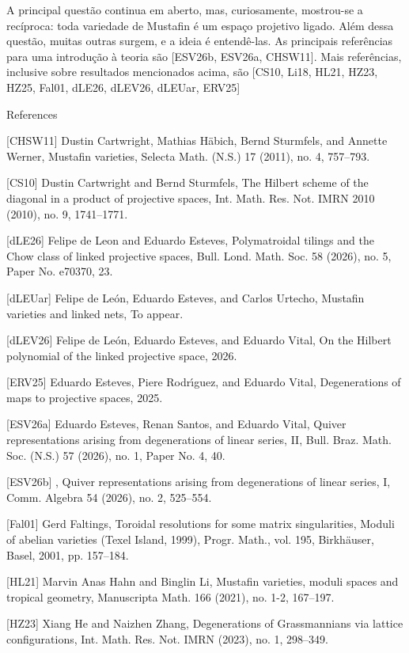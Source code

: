 A principal questão continua em aberto, mas,
curiosamente, mostrou-se a recíproca: toda
variedade de Mustafin é um espaço projetivo
ligado. Além dessa questão, muitas outras
surgem, e a ideia é entendê-las. As
principais referências para uma introdução à
teoria são [ESV26b, ESV26a, CHSW11]. Mais
referências, inclusive sobre resultados
mencionados acima, são [CS10, Li18, HL21,
HZ23, HZ25, Fal01, dLE26, dLEV26, dLEUar,
ERV25]

References

[CHSW11] Dustin Cartwright, Mathias H\"abich,
Bernd Sturmfels, and Annette Werner, Mustafin
varieties, Selecta Math. (N.S.) 17 (2011),
no. 4, 757–793.

[CS10] Dustin Cartwright and Bernd Sturmfels,
The Hilbert scheme of the diagonal in a
product of projective spaces, Int. Math. Res.
Not. IMRN 2010 (2010), no. 9, 1741–1771.

[dLE26] Felipe de Leon and Eduardo Esteves,
Polymatroidal tilings and the Chow class of
linked projective spaces, Bull. Lond. Math.
Soc. 58 (2026), no. 5, Paper No. e70370, 23.

[dLEUar] Felipe de León, Eduardo Esteves, and
Carlos Urtecho, Mustafin varieties and linked
nets, To appear.

[dLEV26] Felipe de León, Eduardo Esteves, and
Eduardo Vital, On the Hilbert polynomial of
the linked projective space, 2026.

[ERV25] Eduardo Esteves, Piere Rodr\'\i guez,
and Eduardo Vital, Degenerations of maps to
projective spaces, 2025.

[ESV26a] Eduardo Esteves, Renan Santos, and
Eduardo Vital, Quiver representations arising
from degenerations of linear series, II,
Bull. Braz. Math. Soc. (N.S.) 57 (2026), no.
1, Paper No. 4, 40.

[ESV26b] , Quiver representations arising
from degenerations of linear series, I, Comm.
Algebra 54 (2026), no. 2, 525–554.

[Fal01] Gerd Faltings, Toroidal resolutions
for some matrix singularities, Moduli of
abelian varieties (Texel Island, 1999),
Progr. Math., vol. 195, Birkh\"auser, Basel,
2001, pp. 157–184.

[HL21] Marvin Anas Hahn and Binglin Li,
Mustafin varieties, moduli spaces and
tropical geometry, Manuscripta Math. 166
(2021), no. 1-2, 167–197.

[HZ23] Xiang He and Naizhen Zhang,
Degenerations of Grassmannians via lattice
configurations, Int. Math. Res. Not. IMRN
(2023), no. 1, 298–349.

